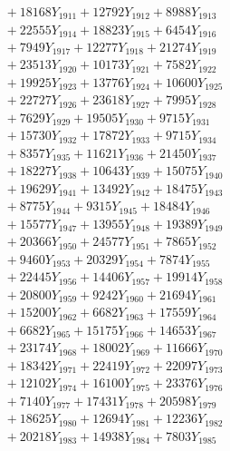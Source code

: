\documentclass[a4paper,10pt]{article}
\begin{document}
{\begin{align}
&\;  + 18168 Y_{1911} + 12792 Y_{1912} + 8988 Y_{1913} \\[0.3ex]
&\;  + 22555 Y_{1914} + 18823 Y_{1915} + 6454 Y_{1916} \\[0.3ex]
&\;  + 7949 Y_{1917} + 12277 Y_{1918} + 21274 Y_{1919} \\[0.5ex]\allowbreak
&\;  + 23513 Y_{1920} + 10173 Y_{1921} + 7582 Y_{1922} \\[0.3ex]
&\;  + 19925 Y_{1923} + 13776 Y_{1924} + 10600 Y_{1925} \\[0.3ex]
&\;  + 22727 Y_{1926} + 23618 Y_{1927} + 7995 Y_{1928} \\[0.3ex]
&\;  + 7629 Y_{1929} + 19505 Y_{1930} + 9715 Y_{1931} \\[0.3ex]
&\;  + 15730 Y_{1932} + 17872 Y_{1933} + 9715 Y_{1934} \\[0.3ex]
&\;  + 8357 Y_{1935} + 11621 Y_{1936} + 21450 Y_{1937} \\[0.3ex]
&\;  + 18227 Y_{1938} + 10643 Y_{1939} + 15075 Y_{1940} \\[0.3ex]
&\;  + 19629 Y_{1941} + 13492 Y_{1942} + 18475 Y_{1943} \\[0.3ex]
&\;  + 8775 Y_{1944} + 9315 Y_{1945} + 18484 Y_{1946} \\[0.3ex]
&\;  + 15577 Y_{1947} + 13955 Y_{1948} + 19389 Y_{1949} \\[0.5ex]\allowbreak
&\;  + 20366 Y_{1950} + 24577 Y_{1951} + 7865 Y_{1952} \\[0.3ex]
&\;  + 9460 Y_{1953} + 20329 Y_{1954} + 7874 Y_{1955} \\[0.3ex]
&\;  + 22445 Y_{1956} + 14406 Y_{1957} + 19914 Y_{1958} \\[0.3ex]
&\;  + 20800 Y_{1959} + 9242 Y_{1960} + 21694 Y_{1961} \\[0.3ex]
&\;  + 15200 Y_{1962} + 6682 Y_{1963} + 17559 Y_{1964} \\[0.3ex]
&\;  + 6682 Y_{1965} + 15175 Y_{1966} + 14653 Y_{1967} \\[0.3ex]
&\;  + 23174 Y_{1968} + 18002 Y_{1969} + 11666 Y_{1970} \\[0.3ex]
&\;  + 18342 Y_{1971} + 22419 Y_{1972} + 22097 Y_{1973} \\[0.3ex]
&\;  + 12102 Y_{1974} + 16100 Y_{1975} + 23376 Y_{1976} \\[0.3ex]
&\;  + 7140 Y_{1977} + 17431 Y_{1978} + 20598 Y_{1979} \\[0.5ex]\allowbreak
&\;  + 18625 Y_{1980} + 12694 Y_{1981} + 12236 Y_{1982} \\[0.3ex]
&\;  + 20218 Y_{1983} + 14938 Y_{1984} + 7803 Y_{1985} \\[0.3ex]

\end{align}}
\end{document}
